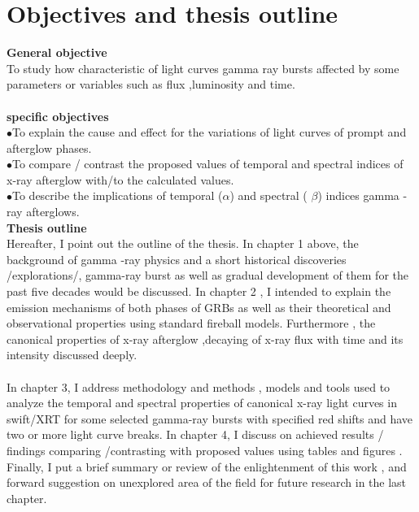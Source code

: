 \section{Objectives and thesis outline}
\textbf{General objective}\\
 To study how characteristic of light curves gamma ray bursts affected by some  parameters or variables such as flux ,luminosity and  time.\\\\   
\textbf{specific objectives}\\
$\bullet$To explain the  cause and effect  for the  variations of light curves of  prompt and afterglow phases.\\
$\bullet$To compare / contrast the proposed values of temporal and spectral  indices of x-ray afterglow with/to the calculated values.\\
$\bullet$To describe the implications of  temporal ($\alpha$) and spectral ( $ \beta $) indices gamma -ray afterglows.\\
\textbf{Thesis outline}\\
 Hereafter, I point out the outline of the thesis. In chapter 1 above, the  background of gamma -ray physics  and a short historical discoveries /explorations/, gamma-ray burst as well as  gradual development of them for the past  five decades would be discussed. In chapter 2 , I intended to explain the emission mechanisms of both phases of GRBs as well as  their  theoretical and observational properties  using standard fireball models. Furthermore , the canonical properties of x-ray afterglow ,decaying  of x-ray flux with time and its intensity discussed deeply. \\\\
In chapter 3, I address  methodology and  methods , models and tools  used to analyze the temporal and spectral properties of canonical x-ray light curves in swift/XRT for some selected gamma-ray bursts with specified red shifts and have two or more light curve breaks.
In chapter 4, I  discuss on achieved results / findings  comparing /contrasting with proposed values  using tables and figures . Finally, I put  a brief summary or review of the enlightenment of this work , and   forward suggestion on unexplored area of the field  for future research in the last chapter. 
